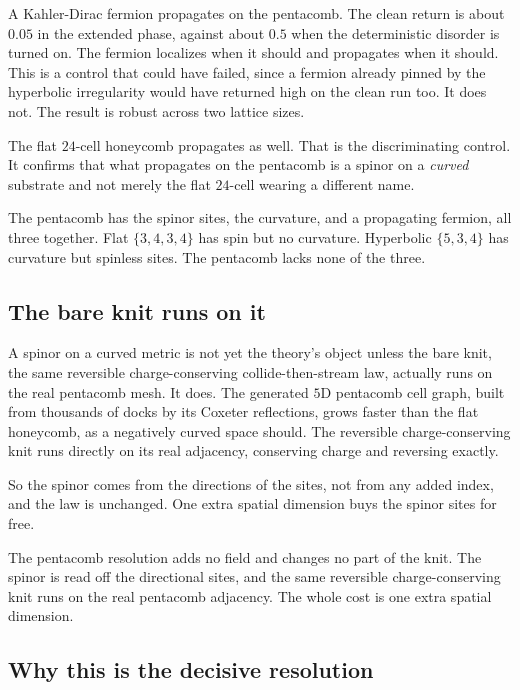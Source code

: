A Kahler-Dirac fermion propagates on the pentacomb. The clean return is about $0.05$
in the extended phase, against about $0.5$ when the deterministic disorder is turned
on. The fermion localizes when it should and propagates when it should. This is a
control that could have failed, since a fermion already pinned by the hyperbolic
irregularity would have returned high on the clean run too. It does not. The result
is robust across two lattice sizes.

The flat $24$-cell honeycomb propagates as well. That is the discriminating control.
It confirms that what propagates on the pentacomb is a spinor on a \emph{curved}
substrate and not merely the flat $24$-cell wearing a different name.

\begin{result}
The pentacomb has the spinor sites, the curvature, and a propagating fermion, all
three together. Flat $\{3,4,3,4\}$ has spin but no curvature. Hyperbolic $\{5,3,4\}$
has curvature but spinless sites. The pentacomb lacks none of the three.
\end{result}

\subsection{The bare knit runs on it}

A spinor on a curved metric is not yet the theory's object unless the bare knit, the
same reversible charge-conserving collide-then-stream law, actually runs on the real
pentacomb mesh. It does. The generated $5$D pentacomb cell graph, built from
thousands of docks by its Coxeter reflections, grows faster than the flat honeycomb,
as a negatively curved space should. The reversible charge-conserving knit runs
directly on its real adjacency, conserving charge and reversing exactly.

So the spinor comes from the directions of the sites, not from any added index, and
the law is unchanged. One extra spatial dimension buys the spinor sites for free.

\begin{principle}
The pentacomb resolution adds no field and changes no part of the knit. The spinor is
read off the directional sites, and the same reversible charge-conserving knit runs
on the real pentacomb adjacency. The whole cost is one extra spatial dimension.
\end{principle}

\subsection{Why this is the decisive resolution}

